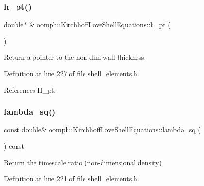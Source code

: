 \mbox{\label{classoomph_1_1KirchhoffLoveShellEquations_a3afe9309aa307964592b4707735bb2c6}} 
\subsubsection{\texorpdfstring{h\+\_\+pt()}{h\_pt()}}
{\footnotesize\ttfamily double$\ast$ \& oomph\+::\+Kirchhoff\+Love\+Shell\+Equations\+::h\+\_\+pt (\begin{DoxyParamCaption}{ }\end{DoxyParamCaption})\hspace{0.3cm}{\ttfamily [inline]}}



Return a pointer to the non-\/dim wall thickness. 



Definition at line 227 of file shell\+\_\+elements.\+h.



References H\+\_\+pt.

\mbox{\label{classoomph_1_1KirchhoffLoveShellEquations_a7aa4747799a388a31f42333819cf0d6e}} 
\subsubsection{\texorpdfstring{lambda\+\_\+sq()}{lambda\_sq()}}
{\footnotesize\ttfamily const double\& oomph\+::\+Kirchhoff\+Love\+Shell\+Equations\+::lambda\+\_\+sq (\begin{DoxyParamCaption}{ }\end{DoxyParamCaption}) const\hspace{0.3cm}{\ttfamily [inline]}}



Return the timescale ratio (non-\/dimensional density) 



Definition at line 221 of file shell\+\_\+elements.\+h.




